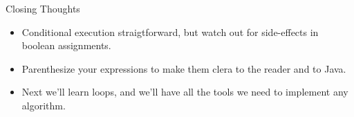 \documentclass{beamer}
\begin{document}
\begin{frame}[fragile]{Closing Thoughts}


\begin{itemize}
\item Conditional execution straigtforward, but watch out for side-effects in boolean assignments.
\item Parenthesize your expressions to make them clera to the reader and to Java.
\item Next we'll learn loops, and we'll have all the tools we need to implement any algorithm.
\end{itemize}


\end{frame}
\end{document}
